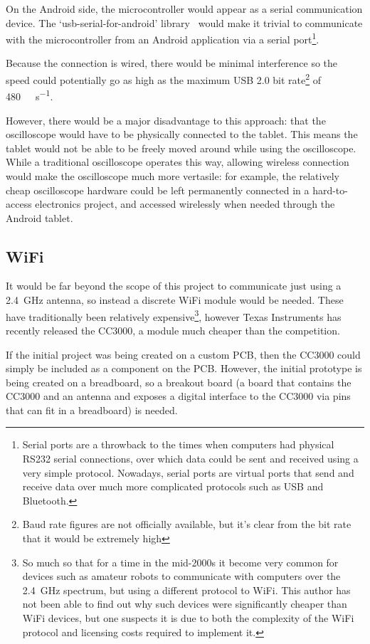 On the Android side, the microcontroller would appear as a serial communication
device. The `usb-serial-for-android' library~\autocite{AndroidUSBSerial} would
make it trivial to communicate with the microcontroller from an Android
application via a serial port\footnote{Serial ports are a throwback to the times
when computers had physical RS232 serial connections, over which data could be
sent and received using a very simple protocol. Nowadays, serial ports are
virtual ports that send and receive data over much more complicated protocols
such as USB and Bluetooth.}.

Because the connection is wired, there would be minimal interference so the
speed could potentially go as high as the maximum USB 2.0 bit rate\footnote{Baud
rate figures are not officially available, but it's clear from the bit rate that
it would be extremely high} of \SI{480}{\mega\bit\per\second}.

However, there would be a major disadvantage to this approach: that the
oscilloscope would have to be physically connected to the tablet. This means the
tablet would not be able to be freely moved around while using the oscilloscope.
While a traditional oscilloscope operates this way, allowing wireless connection
would make the oscilloscope much more vertasile: for example, the relatively
cheap oscilloscope hardware could be left permanently connected in a
hard-to-access electronics project, and accessed wirelessly when needed through
the Android tablet.

\subsection*{WiFi}

It would be far beyond the scope of this project to communicate just using a
\SI{2.4}{\GHz} antenna, so instead a discrete WiFi module would be needed. These
have traditionally been relatively expensive\footnote{So much so that for a time
in the mid-2000s it become very common for devices such as amateur robots to
communicate with computers over the \SI{2.4}{\GHz} spectrum, but using a
different protocol to WiFi. This author has not been able to find out why such
devices were significantly cheaper than WiFi devices, but one suspects it is due
to both the complexity of the WiFi protocol and licensing costs required to
implement it.}, however Texas Instruments has recently released the CC3000, a
module much cheaper than the competition.~\autocite{CC3000Cheap}

If the initial project was being created on a custom PCB, then the CC3000 could
simply be included as a component on the PCB. However, the initial prototype is being
created on a breadboard, so a breakout board (a board that contains the CC3000
and an antenna and exposes a digital interface to the CC3000 via pins that can
fit in a breadboard) is needed.

